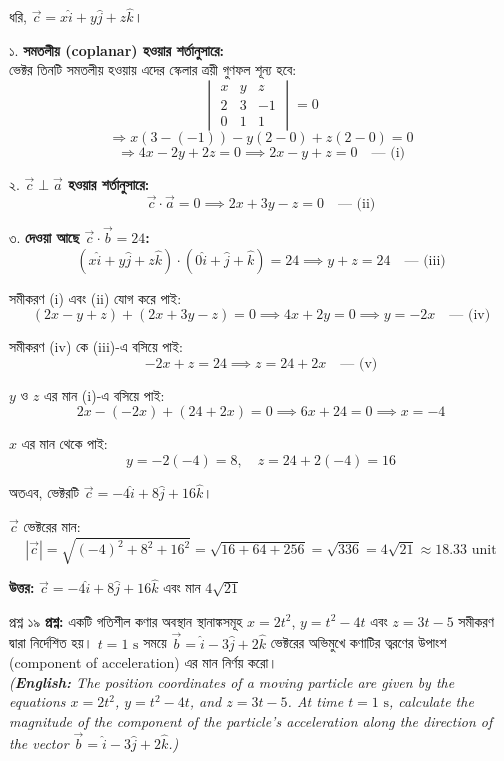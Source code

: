 \documentclass[11pt,a4paper]{article}
\begin{document}
\begin{solbox}
\begin{solbox}
ধরি, $\vec{c} = x\hat{i} + y\hat{j} + z\hat{k}$।

১. \textbf{সমতলীয় (coplanar) হওয়ার শর্তানুসারে:} \\
ভেক্টর তিনটি সমতলীয় হওয়ায় এদের স্কেলার ত্রয়ী গুণফল শূন্য হবে:
$$\begin{vmatrix} x & y & z \\ 2 & 3 & -1 \\ 0 & 1 & 1 \end{vmatrix} = 0$$
$$\Rightarrow x(3 - (-1)) - y(2 - 0) + z(2 - 0) = 0$$
$$\Rightarrow 4x - 2y + 2z = 0 \implies 2x - y + z = 0 \quad \text{--- (i)}$$

২. \textbf{$\vec{c} \perp \vec{a}$ হওয়ার শর্তানুসারে:}
$$\vec{c} \cdot \vec{a} = 0 \implies 2x + 3y - z = 0 \quad \text{--- (ii)}$$

৩. \textbf{দেওয়া আছে $\vec{c} \cdot \vec{b} = 24$:}
$$(x\hat{i} + y\hat{j} + z\hat{k}) \cdot (0\hat{i} + \hat{j} + \hat{k}) = 24 \implies y + z = 24 \quad \text{--- (iii)}$$

সমীকরণ (i) এবং (ii) যোগ করে পাই:
$$(2x - y + z) + (2x + 3y - z) = 0 \implies 4x + 2y = 0 \implies y = -2x \quad \text{--- (iv)}$$

সমীকরণ (iv) কে (iii)-এ বসিয়ে পাই:
$$-2x + z = 24 \implies z = 24 + 2x \quad \text{--- (v)}$$

$y$ ও $z$ এর মান (i)-এ বসিয়ে পাই:
$$2x - (-2x) + (24 + 2x) = 0 \implies 6x + 24 = 0 \implies x = -4$$

$x$ এর মান থেকে পাই:
$$y = -2(-4) = 8, \quad z = 24 + 2(-4) = 16$$

অতএব, ভেক্টরটি $\vec{c} = -4\hat{i} + 8\hat{j} + 16\hat{k}$।

$\vec{c}$ ভেক্টরের মান:
$$|\vec{c}| = \sqrt{(-4)^2 + 8^2 + 16^2} = \sqrt{16 + 64 + 256} = \sqrt{336} = 4\sqrt{21} \approx 18.33\text{ unit}$$

\textbf{উত্তর:} $\vec{c} = -4\hat{i} + 8\hat{j} + 16\hat{k}$ এবং মান $4\sqrt{21}$
\end{solbox}

\vspace{0.4cm}

\begin{qbox}{প্রশ্ন ১৯}
\textbf{প্রশ্ন:} একটি গতিশীল কণার অবস্থান স্থানাঙ্কসমূহ $x = 2t^2$, $y = t^2 - 4t$ এবং $z = 3t - 5$ সমীকরণ দ্বারা নির্দেশিত হয়। $t = 1\text{ s}$ সময়ে $\vec{b} = \hat{i} - 3\hat{j} + 2\hat{k}$ ভেক্টরের অভিমুখে কণাটির ত্বরণের উপাংশ (component of acceleration) এর মান নির্ণয় করো। \\
\textit{(\textbf{English:} The position coordinates of a moving particle are given by the equations $x = 2t^2$, $y = t^2 - 4t$, and $z = 3t - 5$. At time $t = 1\text{ s}$, calculate the magnitude of the component of the particle's acceleration along the direction of the vector $\vec{b} = \hat{i} - 3\hat{j} + 2\hat{k}$.)}
\end{qbox}


\end{solbox}
\end{document}
